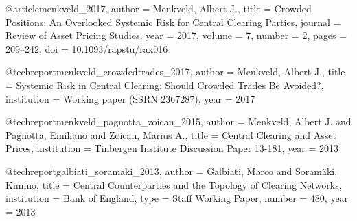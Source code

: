 
@article{menkveld_2017,
  author  = {Menkveld, Albert J.},
  title   = {Crowded Positions: An Overlooked Systemic Risk for Central Clearing Parties},
  journal = {Review of Asset Pricing Studies},
  year    = {2017}, volume = {7}, number = {2}, pages = {209--242},
  doi     = {10.1093/rapstu/rax016}
}


@techreport{menkveld_crowdedtrades_2017,
  author      = {Menkveld, Albert J.},
  title       = {Systemic Risk in Central Clearing: Should Crowded Trades Be Avoided?},
  institution = {Working paper (SSRN 2367287)}, year = {2017}
}


@techreport{menkveld_pagnotta_zoican_2015,
  author      = {Menkveld, Albert J. and Pagnotta, Emiliano and Zoican, Marius A.},
  title       = {Central Clearing and Asset Prices},
  institution = {Tinbergen Institute Discussion Paper 13-181}, year = {2013}
}


@techreport{galbiati_soramaki_2013,
  author      = {Galbiati, Marco and Soram{\"a}ki, Kimmo},
  title       = {Central Counterparties and the Topology of Clearing Networks},
  institution = {Bank of England}, type = {Staff Working Paper}, number = {480}, year = {2013}
}


